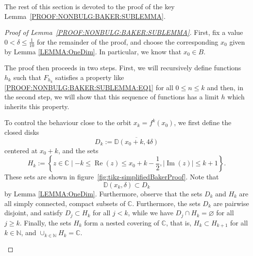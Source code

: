 \documentclass[a4paper, 12pt, twoside]{amsart}
\theoremstyle{definition}
\numberwithin{equation}{section}
\renewcommand{\Im}{\operatorname{Im}}
\renewcommand{\Re}{\operatorname{Re}}
\newcommand{\C}{{\mathbb C}}
\newcommand{\D}{{\mathbb D}}
\newcommand{\N}{{\mathbb N}}
\renewcommand{\emptyset}{\varnothing}
\begin{document}
The rest of this section is devoted to the proof of the key Lemma~\ref{PROOF:NONBULG:BAKER:SUBLEMMA}.
    \begin{proof}[Proof of Lemma~\ref{PROOF:NONBULG:BAKER:SUBLEMMA}]
        First, fix a value $0 < \delta \leq \frac{1}{10}$ for the remainder of the proof, and choose the corresponding $x_0$ given by Lemma \ref{LEMMA:OneDim}. In particular, we know that $x_0 \in B$.

        The proof then proceeds in two steps. First, we will recursively define functions $h_k$ such that $F_{h_k}$ satisfies a property like \eqref{PROOF:NONBULG:BAKER:SUBLEMMA:EQ1} for all $0 \leq n \leq k$ and then, in the second step, we will show that this sequence of functions has a limit $h$ which inherits this property.

        To control the behaviour close to the orbit $x_k = f^k(x_0)$, we first define the closed disks 
        \begin{equation*}
            D_k := \overline{\D(x_0 + k, 4\delta)}
        \end{equation*}
        centered at $x_0 + k$, and the sets 
        \begin{equation*}
            H_{k} := \left\{z \in \C\mid-k \leq \Re(z) \leq x_0 + k - \frac{1}{2}, |{\Im(z)}| \leq k+1\right\}.
        \end{equation*}
        These sets are shown in figure~\ref{fig:tikz-simplifiedBakerProof}. Note that
        \begin{equation*}
            \D(x_k, \delta) \subset D_k
        \end{equation*}
        by Lemma \ref{LEMMA:OneDim}. Furthermore, observe that the sets $D_k$ and $H_k$ are all simply connected, compact subsets of $\C$. Furthermore, the sets $D_k$ are pairwise disjoint, and satisfy $D_j \subset H_k$ for all $j < k$, while we have $D_j \cap H_k = \emptyset$ for all $j \geq k$. Finally, the sets $H_k$ form a nested covering of $\C$, that is, $H_k \subset H_{k+1}$ for all $k\in\N$, and $\cup_{k\in\N}H_k = \C$. 

        \begin{figure}[htbp]
            \centering
\end{figure}
\end{proof}
\end{document}
